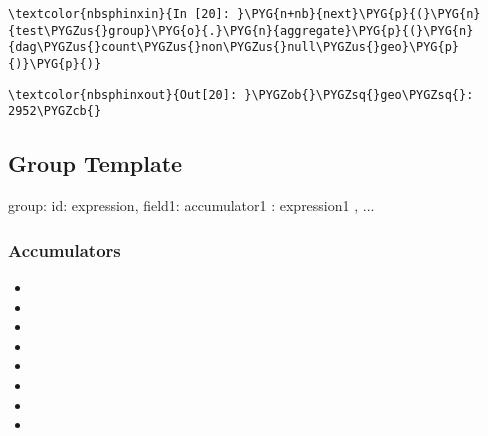 \documentclass[letterpaper,10pt,english]{sphinxmanual}
\begin{document}
%
\begin{Verbatim}[commandchars=\\\{\}]
\textcolor{nbsphinxin}{In [20]: }\PYG{n+nb}{next}\PYG{p}{(}\PYG{n}{test\PYGZus{}group}\PYG{o}{.}\PYG{n}{aggregate}\PYG{p}{(}\PYG{n}{dag\PYGZus{}count\PYGZus{}non\PYGZus{}null\PYGZus{}geo}\PYG{p}{)}\PYG{p}{)}
\end{Verbatim}

%
\begin{Verbatim}[commandchars=\\\{\}]
\textcolor{nbsphinxout}{Out[20]: }\PYGZob{}\PYGZsq{}geo\PYGZsq{}: 2952\PYGZcb{}
\end{Verbatim}


\subsection{Group Template}
\label{\detokenize{04-mongo/04-02-pipelines:Group-Template}}
%
\begin{sphinxVerbatim}[commandchars=\\\{\}]
\PYGZob{} \PYGZdl{}group: \PYGZob{} \PYGZus{}id: \PYGZlt{}expression\PYGZgt{}, \PYGZlt{}field1\PYGZgt{}: \PYGZob{} \PYGZlt{}accumulator1\PYGZgt{} : \PYGZlt{}expression1\PYGZgt{} \PYGZcb{}, ... \PYGZcb{} \PYGZcb{}
\end{sphinxVerbatim}


\subsubsection{Accumulators}
\label{\detokenize{04-mongo/04-02-pipelines:Accumulators}}\begin{itemize}
\item {} 

\item {} 

\item {} 

\item {} 

\item {} 

\item {} 

\item {} 

\item {} 

\end{itemize}
\end{document}
